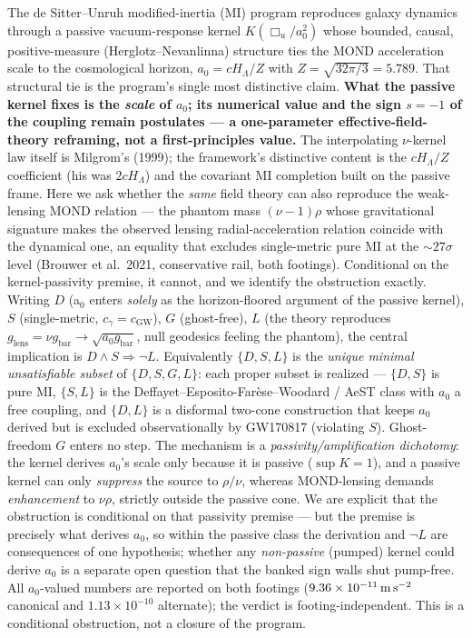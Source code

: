 \documentclass[
]{article}
\begin{document}
The de Sitter--Unruh modified-inertia (MI) program reproduces galaxy
dynamics through a passive vacuum-response kernel \(K(\Box_u/a_0^2)\)
whose bounded, causal, positive-measure (Herglotz--Nevanlinna) structure
ties the MOND acceleration scale to the cosmological horizon,
\(a_0 = cH_\Lambda/Z\) with \(Z=\sqrt{32\pi/3}=5.789\). That structural
tie is the program's single most distinctive claim. \textbf{What the
passive kernel fixes is the \emph{scale} of \(a_0\); its numerical value
and the sign \(s=-1\) of the coupling remain postulates --- a
one-parameter effective-field-theory reframing, not a first-principles
value.} The interpolating \(\nu\)-kernel law itself is Milgrom's (1999);
the framework's distinctive content is the \(cH_\Lambda/Z\) coefficient
(his was \(2cH_\Lambda\)) and the covariant MI completion built on the
passive frame. Here we ask whether the \emph{same} field theory can also
reproduce the weak-lensing MOND relation --- the phantom mass
\((\nu-1)\rho\) whose gravitational signature makes the observed lensing
radial-acceleration relation coincide with the dynamical one, an
equality that excludes single-metric pure MI at the \(\sim27\sigma\)
level (Brouwer et al.~2021, conservative rail, both footings).
Conditional on the kernel-passivity premise, it cannot, and we identify
the obstruction exactly. Writing \(D\) (a\(_0\) enters \emph{solely} as
the horizon-floored argument of the passive kernel), \(S\)
(single-metric, \(c_\gamma=c_\mathrm{GW}\)), \(G\) (ghost-free), \(L\) (the
theory reproduces
\(g_\mathrm{lens}=\nu g_\mathrm{bar}\to\sqrt{a_0 g_\mathrm{bar}}\), null
geodesics feeling the phantom), the central implication is
\textbf{\(D\wedge S \Rightarrow \lnot L\)}. Equivalently \(\{D,S,L\}\)
is the \emph{unique minimal unsatisfiable subset} of \(\{D,S,G,L\}\):
each proper subset is realized --- \(\{D,S\}\) is pure MI, \(\{S,L\}\)
is the Deffayet--Esposito-Farèse--Woodard / AeST class with \(a_0\) a
free coupling, and \(\{D,L\}\) is a disformal two-cone construction that
keeps \(a_0\) derived but is excluded observationally by GW170817
(violating \(S\)). Ghost-freedom \(G\) enters no step. The mechanism is
a \emph{passivity/amplification dichotomy}: the kernel derives \(a_0\)'s
scale only because it is passive (\(\sup K = 1\)), and a passive kernel
can only \emph{suppress} the source to \(\rho/\nu\), whereas
MOND-lensing demands \emph{enhancement} to \(\nu\rho\), strictly outside
the passive cone. We are explicit that the obstruction is conditional on
that passivity premise --- but the premise is precisely what derives
\(a_0\), so within the passive class the derivation and \(\lnot L\) are
consequences of one hypothesis; whether any \emph{non-passive} (pumped)
kernel could derive \(a_0\) is a separate open question that the banked
sign walls shut pump-free. All \(a_0\)-valued numbers are reported on
both footings (\(9.36\times10^{-11}\,{\rm m\,s^{-2}}\) canonical and
\(1.13\times10^{-10}\) alternate); the verdict is footing-independent.
This is a conditional obstruction, not a closure of the program.
\end{document}

